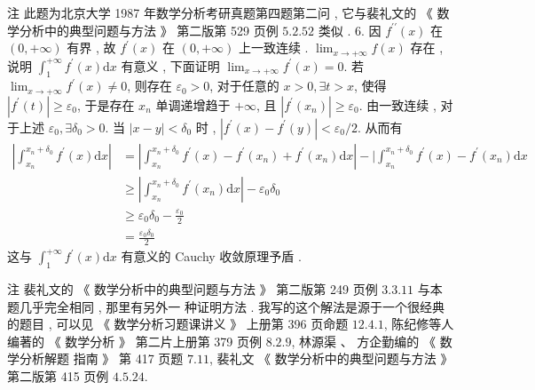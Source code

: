 \documentclass[10pt]{article}
\begin{document}
{ 注   此题为北京大学  1987  年数学分析考研真题第四题第二问 ,  它与裴礼文的 《 数学分析中的典型问题与方法 》  第二版第  529  页例  $5.2 .52$  类似 . 6.  因  $f^{\prime \prime}(x)$  在  $(0,+\infty)$  有界 ,  故  $f^{\prime}(x)$  在  $(0,+\infty)$  上一致连续 . $\lim _{x \rightarrow+\infty} f(x)$  存在 ,  说明  $\int_{1}^{+\infty} f^{\prime}(x) \mathrm{d} x$  有意义 ,  下面证明  $\lim _{x \rightarrow+\infty} f^{\prime}(x)=0$.  若  $\lim _{x \rightarrow+\infty} f^{\prime}(x) \neq 0$,  则存在  $\varepsilon_{0}>0$,  对于任意的  $x>0, \exists t>x$,  使得  $\left|f^{\prime}(t)\right| \geqslant \varepsilon_{0}$,  于是存在  $x_{n}$  单调递增趋于  $+\infty$,  且  $\left|f^{\prime}\left(x_{n}\right)\right| \geqslant \varepsilon_{0}$.  由一致连续 ,  对于上述  $\varepsilon_{0}, \exists \delta_{0}>0$.  当  $|x-y|<\delta_{0}$  时 , $\left|f^{\prime}(x)-f^{\prime}(y)\right|<\varepsilon_{0} / 2$.  从而有 
$$
\begin{aligned}
\left|\int_{x_{n}}^{x_{n}+\delta_{0}} f^{\prime}(x) \mathrm{d} x\right| &=\left|\int_{x_{n}}^{x_{n}+\delta_{0}} f^{\prime}(x)-f^{\prime}\left(x_{n}\right)+f^{\prime}\left(x_{n}\right) \mathrm{d} x\right|-\mid \int_{x_{n}}^{x_{n}+\delta_{0}} f^{\prime}(x)-f^{\prime}\left(x_{n}\right) \mathrm{d} x \\
& \geqslant\left|\int_{x_{n}}^{x_{n}+\delta_{0}} f^{\prime}\left(x_{n}\right) \mathrm{d} x\right|-\varepsilon_{0} \delta_{0} \\
& \geqslant \varepsilon_{0} \delta_{0}-\frac{\varepsilon_{0}}{2} \\
&=\frac{\varepsilon_{0} \delta_{0}}{2}
\end{aligned}
$$
 这与  $\int_{1}^{+\infty} f^{\prime}(x) \mathrm{d} x$  有意义的  Cauchy  收敛原理予盾 .

 注   裴礼文的 《 数学分析中的典型问题与方法 》 第二版第  249  页例  $3.3 .11$  与本题几乎完全相同 ,  那里有另外一   种证明方法 .  我写的这个解法是源于一个很经典的题目 ,  可以见 《 数学分析习题课讲义 》 上册第  396  页命题  $12.4 .1$,  陈纪修等人编著的 《 数学分析 》 第二片上册第  379  页例  $8.2 .9$,  林源渠 、 方企勤编的 《 数学分析解题   指南 》 第  417  页题  $7.11$,  裴礼文 《 数学分析中的典型问题与方法 》 第二版第  415  页例  $4.5 .24$.

}
\end{document}
